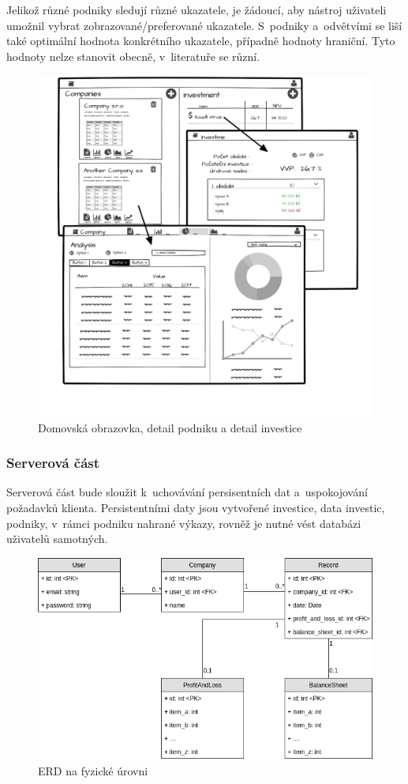 Jelikož různé podniky sledují různé ukazatele, je žádoucí, aby nástroj uživateli umožnil vybrat zobrazované/preferované ukazatele. S~podniky a~odvětvími se liší také optimální hodnota konkrétního ukazatele, případně hodnoty hraniční. Tyto hodnoty nelze stanovit obecně, v~literatuře se různí.


\begin{figure}
  \centering
  \includegraphics[width=14cm]{img/gui_mockup.png}
  \caption{Domovská obrazovka, detail podniku a detail investice}
\end{figure}

\subsubsection{Serverová část}
Serverová část bude sloužit k~uchovávání persisentních dat a~uspokojování požadavků klienta. Persistentními daty jsou vytvořené investice, data investic, podniky, v~rámci podniku nahrané výkazy, rovněž je nutné vést databázi uživatelů samotných.


\begin{figure}
  \centering
  \includegraphics[width=14cm]{img/erd.png}
  \caption{ERD na fyzické úrovni}
\end{figure}

